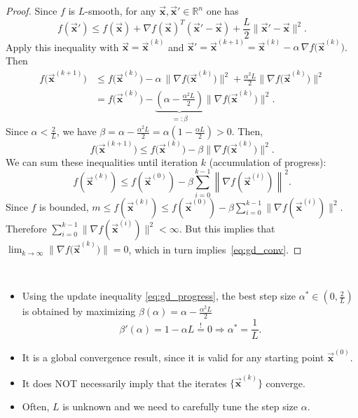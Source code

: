 \documentclass[9pt, headings=standardclasses, parskip=half]{scrartcl}
\renewcommand{\emph}[1]{\textcolor{mypurple}{#1}}
\newcommand{\vect}[1]{\vec{\boldsymbol{#1}}}
\begin{document}
\begin{proof}
Since \(f\) is \(L\)-smooth, for any \(\vect{x},\vect{x}'\in\mathbb{R}^{n}\) one has
\begin{equation}
\label{eq:L_smooth_gradient}
f(\vect{x}')\le f(\vect{x})+\nabla f(\vect{x})^{T}(\vect{x}'-\vect{x})+\frac{L}{2}\|\vect{x}'-\vect{x}\|^{2}.
\end{equation}
Apply this inequality with \(\vect{x}=\vect{x}^{(k)}\) and \(\vect{x}'=\vect{x}^{(k+1)}=\vect{x}^{(k)}-\alpha\,\nabla f\bigl(\vect{x}^{(k)}\bigr)\). Then
\begin{align}
f\bigl(\vect{x}^{(k+1)}\bigr)
&\le f\bigl(\vect{x}^{(k)}\bigr)
-\alpha\,\|\nabla f\bigl(\vect{x}^{(k)}\bigr)\|^{2}
+\frac{\alpha^{2}L}{2}\|\nabla f\bigl(\vect{x}^{(k)}\bigr)\|^{2} \nonumber \\
&= f\bigl(\vect{x}^{(k)}\bigr)-\underbrace{\left(\alpha-\frac{\alpha^{2}L}{2}\right)}_{=: \beta}\|\nabla f\bigl(\vect{x}^{(k)}\bigr)\|^{2}. \label{eq:gd_Lsmooth}
\end{align}
Since \(\alpha < \frac{2}{L}\), we have \(\beta = \alpha - \frac{\alpha^{2}L}{2} = \alpha\left(1-\frac{\alpha L}{2}\right) > 0\). Then,
\begin{equation}
\label{eq:gd_progress}
f\bigl(\vect{x}^{(k+1)}\bigr)\le f\bigl(\vect{x}^{(k)}\bigr)-\beta\|\nabla f\bigl(\vect{x}^{(k)}\bigr)\|^{2}.
\end{equation}
We can sum these inequalities until iteration \(k\) (\emph{accumulation of progress}):
\[
f\left(\vect{x}^{(k)}\right) \le f\left(\vect{x}^{(0)}\right) - \beta\sum_{i=0}^{k-1}\left\|\nabla f\left(\vect{x}^{(i)}\right)\right\|^{2}.
\]
Since \(f\) is bounded, 
\(
m \le f(\vect{x}^{(k)}) \le f(\vect{x}^{(0)}) - \beta\sum_{i=0}^{k-1}\|\nabla f(\vect{x}^{(i)})\|^{2}
\).
Therefore 
\(
\sum_{i=0}^{k-1}\|\nabla f(\vect{x}^{(i)})\|^{2} < \infty
\).
But this implies that
\(
\lim_{k\to\infty}\|\nabla f\bigl(\vect{x}^{(k)}\bigr)\|=0
\), which in turn implies~\eqref{eq:gd_conv}.
\end{proof}

\begin{remark}\
\begin{itemize}
\item Using the update inequality \eqref{eq:gd_progress}, the best step size \(\alpha^{*} \in \left(0,\frac{2}{L}\right)\) is obtained by maximizing
\(
\beta(\alpha)=\alpha-\frac{\alpha^{2}L}{2}
\)
\[
\beta'(\alpha) = 1 - \alpha L \overset{!}{=} 0 \Rightarrow \alpha^{*} = \frac{1}{L}.
\]
\item It is a \emph{global} convergence result, since it is valid for any starting point \(\vect{x}^{(0)}\).
\item It does NOT necessarily imply that the iterates \(\{\vect{x}^{(k)}\}\) converge.
\item Often, \(L\) is unknown and we need to carefully tune the step size \(\alpha\).
\end{itemize}
\end{remark}
\end{document}
